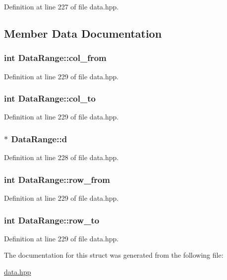 Definition at line 227 of file data.hpp.

\subsection{Member Data Documentation}
\hypertarget{struct_data_range_a0aa3fad400201762e729b5899e916de7}{
\subsubsection[{col\_\-from}]{\setlength{\rightskip}{0pt plus 5cm}int {\bf DataRange::col\_\-from}}}
\label{struct_data_range_a0aa3fad400201762e729b5899e916de7}


Definition at line 229 of file data.hpp.\hypertarget{struct_data_range_a7972ade60d7e0b41e840b4f1719156eb}{
\subsubsection[{col\_\-to}]{\setlength{\rightskip}{0pt plus 5cm}int {\bf DataRange::col\_\-to}}}
\label{struct_data_range_a7972ade60d7e0b41e840b4f1719156eb}


Definition at line 229 of file data.hpp.\hypertarget{struct_data_range_a50c6aff4cba6396786730dbf71ea606e}{
\subsubsection[{d}]{$\ast$ {\bf DataRange::d}}}
\label{struct_data_range_a50c6aff4cba6396786730dbf71ea606e}


Definition at line 228 of file data.hpp.\hypertarget{struct_data_range_a5afb680f6208ef6f7268d824dfd1acdf}{
\subsubsection[{row\_\-from}]{\setlength{\rightskip}{0pt plus 5cm}int {\bf DataRange::row\_\-from}}}
\label{struct_data_range_a5afb680f6208ef6f7268d824dfd1acdf}


Definition at line 229 of file data.hpp.\hypertarget{struct_data_range_ac696d8155ade63bcb137163efa4eaad6}{
\subsubsection[{row\_\-to}]{\setlength{\rightskip}{0pt plus 5cm}int {\bf DataRange::row\_\-to}}}
\label{struct_data_range_ac696d8155ade63bcb137163efa4eaad6}


Definition at line 229 of file data.hpp.

The documentation for this struct was generated from the following file:\begin{DoxyCompactItemize}
\item 
\hyperlink{data_8hpp}{data.hpp}\end{DoxyCompactItemize}
